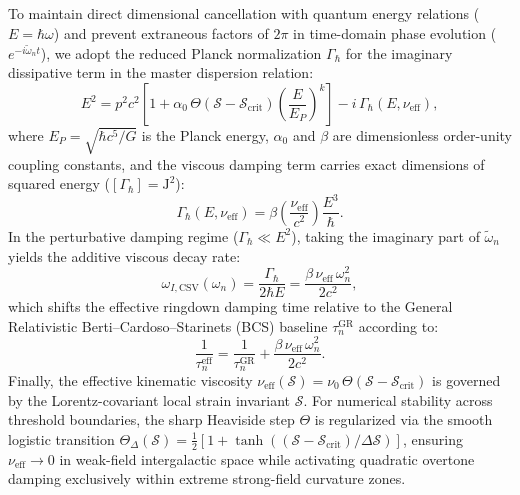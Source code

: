 To maintain direct dimensional cancellation with quantum energy relations ($E = \hbar\omega$) and prevent extraneous factors of $2\pi$ in time-domain phase evolution ($e^{-i\tilde{\omega}_n t}$), we adopt the reduced Planck normalization $\Gamma_{\hbar}$ for the imaginary dissipative term in the master dispersion relation:
\begin{equation}
    E^2 = p^2 c^2 \left[ 1 + \alpha_0\,\Theta(\mathcal{S} - \mathcal{S}_{\mathrm{crit}}) \left(\frac{E}{E_P}\right)^k \right] - i\,\Gamma_{\hbar}(E, \nu_{\mathrm{eff}}),
\end{equation}
where $E_P = \sqrt{\hbar c^5 / G}$ is the Planck energy, $\alpha_0$ and $\beta$ are dimensionless order-unity coupling constants, and the viscous damping term carries exact dimensions of squared energy ($[\Gamma_{\hbar}] = \mathrm{J}^2$):
\begin{equation}
    \Gamma_{\hbar}(E, \nu_{\mathrm{eff}}) = \beta \left(\frac{\nu_{\mathrm{eff}}}{c^2}\right) \frac{E^3}{\hbar}.
\end{equation}
In the perturbative damping regime ($\Gamma_{\hbar} \ll E^2$), taking the imaginary part of $\tilde{\omega}_n$ yields the additive viscous decay rate:
\begin{equation}
    \omega_{I,\mathrm{CSV}}(\omega_n) = \frac{\Gamma_{\hbar}}{2\hbar E} = \frac{\beta\,\nu_{\mathrm{eff}}\,\omega_n^2}{2 c^2},
\end{equation}
which shifts the effective ringdown damping time relative to the General Relativistic Berti--Cardoso--Starinets (BCS) baseline $\tau_n^{\mathrm{GR}}$ according to:
\begin{equation}
    \frac{1}{\tau_n^{\mathrm{eff}}} = \frac{1}{\tau_n^{\mathrm{GR}}} + \frac{\beta\,\nu_{\mathrm{eff}}\,\omega_n^2}{2 c^2}.
\end{equation}
Finally, the effective kinematic viscosity $\nu_{\mathrm{eff}}(\mathcal{S}) = \nu_0\,\Theta(\mathcal{S} - \mathcal{S}_{\mathrm{crit}})$ is governed by the Lorentz-covariant local strain invariant $\mathcal{S}$. For numerical stability across threshold boundaries, the sharp Heaviside step $\Theta$ is regularized via the smooth logistic transition $\Theta_\Delta(\mathcal{S}) = \frac{1}{2}\left[1 + \tanh\left((\mathcal{S} - \mathcal{S}_{\mathrm{crit}})/\Delta\mathcal{S}\right)\right]$, ensuring $\nu_{\mathrm{eff}} \to 0$ in weak-field intergalactic space while activating quadratic overtone damping exclusively within extreme strong-field curvature zones.
